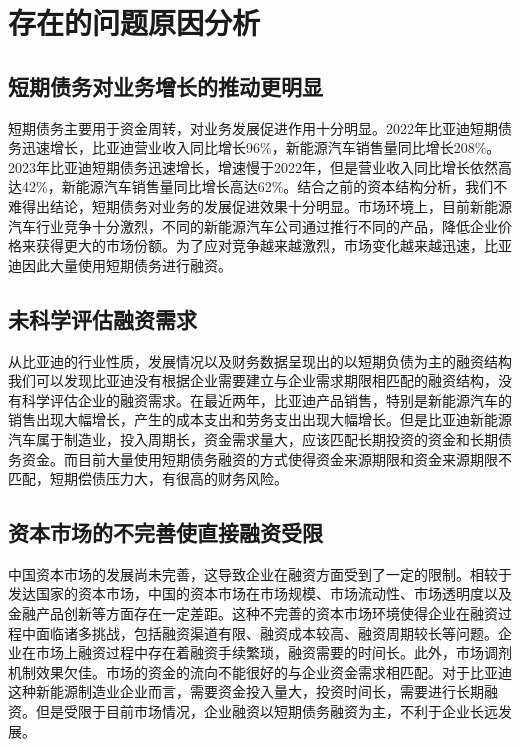 \section{存在的问题原因分析}
\subsection{短期债务对业务增长的推动更明显}
短期债务主要用于资金周转，对业务发展促进作用十分明显。2022年比亚迪短期债务迅速增长，比亚迪营业收入同比增长96\%，新能源汽车销售量同比增长208\%。2023年比亚迪短期债务迅速增长，增速慢于2022年，但是营业收入同比增长依然高达42\%，新能源汽车销售量同比增长高达62\%。结合之前的资本结构分析，我们不难得出结论，短期债务对业务的发展促进效果十分明显。市场环境上，目前新能源汽车行业竞争十分激烈，不同的新能源汽车公司通过推行不同的产品，降低企业价格来获得更大的市场份额。为了应对竞争越来越激烈，市场变化越来越迅速，比亚迪因此大量使用短期债务进行融资。
\subsection{未科学评估融资需求}
从比亚迪的行业性质，发展情况以及财务数据呈现出的以短期负债为主的融资结构我们可以发现比亚迪没有根据企业需要建立与企业需求期限相匹配的融资结构，没有科学评估企业的融资需求。在最近两年，比亚迪产品销售，特别是新能源汽车的销售出现大幅增长，产生的成本支出和劳务支出出现大幅增长。但是比亚迪新能源汽车属于制造业，投入周期长，资金需求量大，应该匹配长期投资的资金和长期债务资金。而目前大量使用短期债务融资的方式使得资金来源期限和资金来源期限不匹配，短期偿债压力大，有很高的财务风险。 
\subsection{资本市场的不完善使直接融资受限}
中国资本市场的发展尚未完善，这导致企业在融资方面受到了一定的限制。相较于发达国家的资本市场，中国的资本市场在市场规模、市场流动性、市场透明度以及金融产品创新等方面存在一定差距。这种不完善的资本市场环境使得企业在融资过程中面临诸多挑战，包括融资渠道有限、融资成本较高、融资周期较长等问题。企业在市场上融资过程中存在着融资手续繁琐，融资需要的时间长。此外，市场调剂机制效果欠佳。市场的资金的流向不能很好的与企业资金需求相匹配。对于比亚迪这种新能源制造业企业而言，需要资金投入量大，投资时间长，需要进行长期融资。但是受限于目前市场情况，企业融资以短期债务融资为主，不利于企业长远发展。

